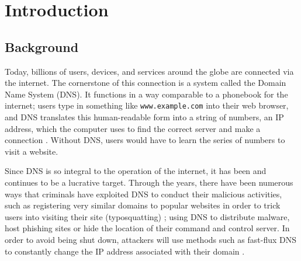 \documentclass[12pt, a4paper, oneside]{report}
\begin{document}
\newpage

\listoftables
{}
\newpage

\listoffigures
{}
\newpage


\newpage

\pagestyle{fancy}


\chapter*{Introduction}
\setcounter{chapter}{1}
\setcounter{section}{0}

\section{Background}

Today, billions of users, devices, and services around the globe are connected via the internet. The cornerstone of this connection is a system called the Domain Name System (DNS). It functions in a way comparable to a phonebook for the internet; users type in something like \texttt{www.example.com} into their web browser, and DNS translates this human-readable form into a string of numbers, an IP address, which the computer uses to find the correct server and make a connection \cite{mockapetris1987rfc1034}. Without DNS, users would have to learn the series of numbers to visit a website.

Since DNS is so integral to the operation of the internet, it has been and continues to be a lucrative target. Through the years, there have been numerous ways that criminals have exploited DNS to conduct their malicious activities, such as registering very similar domains to popular websites in order to trick users into visiting their site (typosquatting) \cite{banerjee2008typosquatting}; using DNS to distribute malware, host phishing sites or hide the location of their command and control server. In order to avoid being shut down, attackers will use methods such as fast-flux DNS to constantly change the IP address associated with their domain \cite{holz2008fastflux}.
\end{document}
